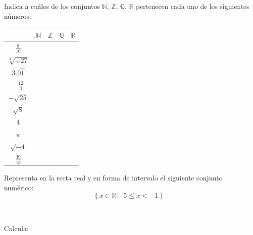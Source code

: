 \documentclass[addpoints,spanish, 12pt,a4paper]{exam}
\begin{document}
\begin{questions}

\question[2] Indica a cuáles de los conjuntos
$\mathbb{N}$, $\mathbb{Z}$, $\mathbb{Q}$, $\mathbb{R}$ pertenecen cada uno de los siguientes números:
\begin{center}
\begin{tabular}{|c |c |c |c |c|}\hline
&$\mathbb{N}$& $\mathbb{Z}$& $\mathbb{Q}$&$\mathbb{R}$\\ 
\hline
$\frac{8}{16}$&&&&\\
\hline
$\sqrt[3]{-27}$&&&&\\
\hline
$3.0\wideparen{1}$&&&&\\
\hline
$-\frac{12}{4}$&&&&\\
\hline
$-\sqrt{25}$&&&&\\
\hline
$\sqrt{8}$&&&&\\
\hline
$4$&&&&\\
\hline
$\pi$&&&&\\
\hline
$\sqrt{-4}$&&&&\\
\hline
$\frac{39}{13}$&&&&\\
\hline
\end{tabular}

\end{center}

\addpoints


\question[1] Representa en la recta real y en forma de intervalo el siguiente conjunto numérico:
\addpoints %
$$\left\{ x \in \mathbb{R} \left| -5 \leqslant x < -1 \right. \right\}$$

\begin{solution}
$ $ 
\end{solution}

\question Calcula: 
\end{questions}
\end{document}
